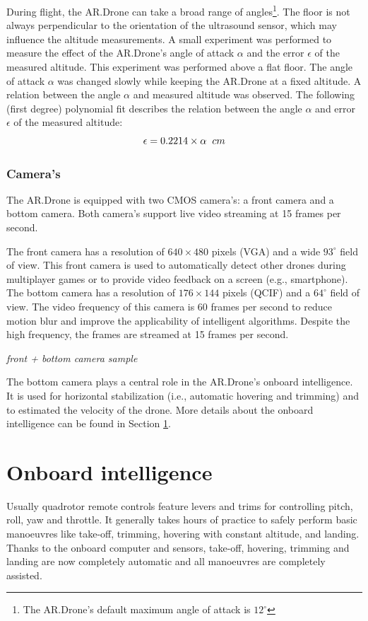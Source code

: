 During flight, the AR.Drone can take a broad range of angles\footnote{The AR.Drone's default maximum angle of attack is $12^{\circ}$}.
The floor is not always perpendicular to the orientation of the ultrasound sensor, which may influence the altitude measurements.
A small experiment was performed to measure the effect of the AR.Drone's angle of attack $\alpha$ and the error $\epsilon$ of the measured altitude.
This experiment was performed above a flat floor.
The angle of attack $\alpha$ was changed slowly while keeping the AR.Drone at a fixed altitude.
A relation between the angle $\alpha$ and measured altitude was observed.
The following (first degree) polynomial fit describes the relation between the angle $\alpha$ and error $\epsilon$ of the measured altitude:
\begin{equation}
\epsilon = 0.2214 \times \alpha \hspace{0.2cm} \small{cm}
\end{equation}
\normalsize
\normalcolor



\subsubsection{Camera's}
The AR.Drone is equipped with two CMOS camera's: a front camera and a bottom camera.
Both camera's support live video streaming at 15 frames per second.

The front camera has a resolution of $640 \times 480$ pixels (VGA) and a wide $93^{\circ}$ field of view.
This front camera is used to automatically detect other drones during multiplayer games or to provide video feedback on a screen (e.g., smartphone).
The bottom camera has a resolution of $176 \times 144$ pixels (QCIF) and a $64^{\circ}$ field of view.
The video frequency of this camera is 60 frames per second to reduce motion blur and improve the applicability of intelligent algorithms.
Despite the high frequency, the frames are streamed at 15 frames per second.

\textit{front + bottom camera sample}

The bottom camera plays a central role in the AR.Drone's onboard intelligence.
It is used for horizontal stabilization (i.e., automatic hovering and trimming) and to estimated the velocity of the drone.
More details about the onboard intelligence can be found in Section \ref{sec:platform_onboard_intelligence}.



\section{Onboard intelligence}
\label{sec:platform_onboard_intelligence}
Usually quadrotor remote controls feature levers and trims for controlling pitch, roll, yaw and throttle.
It generally takes hours of practice to safely perform basic manoeuvres like take-off, trimming, hovering with constant altitude, and landing.
Thanks to the onboard computer and sensors, take-off, hovering, trimming and landing are now completely automatic and all manoeuvres are completely assisted.

